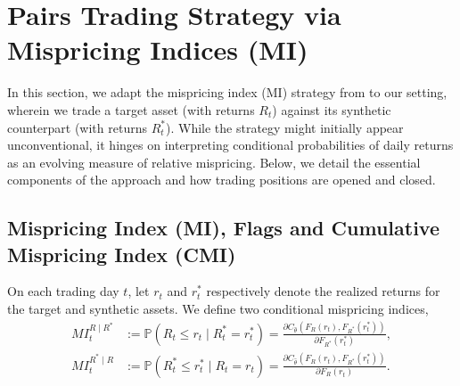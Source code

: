 \section{Pairs Trading Strategy via Mispricing Indices (MI)} \label{sec:trading_strategy}

In this section, we adapt the mispricing index (MI) strategy from \cite{Xie2016} to our setting, wherein we trade a target asset (with returns $R_t$) against its synthetic counterpart (with returns $R_t^*$). While the strategy might initially appear unconventional, it hinges on interpreting conditional probabilities of daily returns as an evolving measure of relative mispricing. Below, we detail the essential components of the approach and how trading positions are opened and closed.

\subsection{Mispricing Index (MI), Flags and Cumulative Mispricing Index (CMI)}

On each trading day $t$, let $r_t$ and $r_t^*$ respectively denote the realized returns for the target and synthetic assets. We define two conditional mispricing indices,
\begin{align*}
MI_t^{R \mid R^*} 
&:= \mathbb{P}(R_t \leq r_t \mid R_t^* = r_t^*)
= 
\frac{\partial C_{\hat{\theta}}(F_R(r_t), F_{R^*}(r_t^*))}{\partial F_{R^*}(r_t^*)}
,
\\[0.4em]
MI_t^{R^* \mid R} 
&:= \mathbb{P}(R_t^* \leq r_t^* \mid R_t = r_t)
= 
\frac{\partial C_{\hat{\theta}}(F_R(r_t), F_{R^*}(r_t^*))}{\partial F_R(r_t)}
.
\end{align*}

